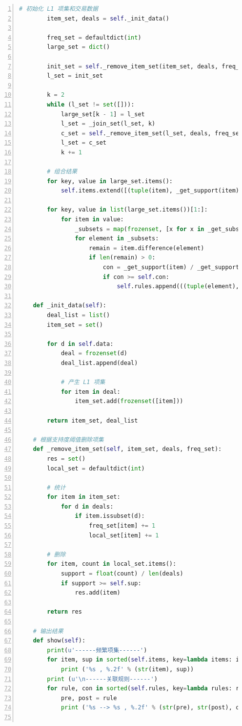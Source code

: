 \documentclass[12pt,a4paper]{article}
\theoremstyle{definition}
\begin{document}
\begin{appendix}
\begin{lstlisting}[language=Python,
	numbers=left,
	keywordstyle=\color{blue!70},
	frame=shadowbox,
	breaklines=True]
        # 初始化 L1 项集和交易数据
        item_set, deals = self._init_data()

        freq_set = defaultdict(int)
        large_set = dict()

        init_set = self._remove_item_set(item_set, deals, freq_set)
        l_set = init_set

        k = 2
        while (l_set != set([])):
            large_set[k - 1] = l_set
            l_set = _join_set(l_set, k)
            c_set = self._remove_item_set(l_set, deals, freq_set)
            l_set = c_set
            k += 1

        # 组合结果
        for key, value in large_set.items():
            self.items.extend([(tuple(item), _get_support(item)) for item in value])

        for key, value in list(large_set.items())[1:]:
            for item in value:
                _subsets = map(frozenset, [x for x in _get_subsets(item)])
                for element in _subsets:
                    remain = item.difference(element)
                    if len(remain) > 0:
                        con = _get_support(item) / _get_support(element)
                        if con >= self.con:
                            self.rules.append(((tuple(element), tuple(remain)), con))

    def _init_data(self):
        deal_list = list()
        item_set = set()

        for d in self.data:
            deal = frozenset(d)
            deal_list.append(deal)

            # 产生 L1 项集
            for item in deal:
                item_set.add(frozenset([item]))

        return item_set, deal_list

    # 根据支持度阈值删除项集
    def _remove_item_set(self, item_set, deals, freq_set):
        res = set()
        local_set = defaultdict(int)

        # 统计
        for item in item_set:
            for d in deals:
                if item.issubset(d):
                    freq_set[item] += 1
                    local_set[item] += 1

        # 删除
        for item, count in local_set.items():
            support = float(count) / len(deals)
            if support >= self.sup:
                res.add(item)

        return res

    # 输出结果
    def show(self):
        print(u'------频繁项集------')
        for item, sup in sorted(self.items, key=lambda items: items[1]):
            print ('%s , %.2f' % (str(item), sup))
        print (u'\n------关联规则------')
        for rule, con in sorted(self.rules, key=lambda rules: rules[1]):
            pre, post = rule
            print ('%s --> %s , %.2f' % (str(pre), str(post), con))


\end{lstlisting}
\end{appendix}
\end{document}
